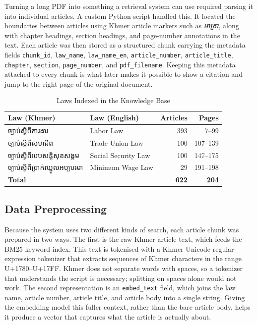 \hs Turning a long PDF into something a retrieval system can use required parsing it
into individual articles. A custom Python script handled this. It located the boundaries
between articles using Khmer article markers such as \textit{មាត្រា}, along with chapter
headings, section headings, and page-number annotations in the text. Each article was
then stored as a structured chunk carrying the metadata fields \texttt{chunk\_id},
\texttt{law\_name}, \texttt{law\_name\_en}, \texttt{article\_number},
\texttt{article\_title}, \texttt{chapter}, \texttt{section}, \texttt{page\_number}, and
\texttt{pdf\_filename}. Keeping this metadata attached to every chunk is what later makes
it possible to show a citation and jump to the right page of the original document.

\begin{table}[H]
\centering
\caption{Laws Indexed in the Knowledge Base}
\label{tab:laws_indexed}
\begin{tabular}{p{5cm} p{4cm} r r}
\toprule
\textbf{Law (Khmer)} & \textbf{Law (English)} & \textbf{Articles} & \textbf{Pages} \\
\midrule
{\khmerfont ច្បាប់ស្តីពីការងារ} & Labor Law & 393 & 7--99 \\
{\khmerfont ច្បាប់ស្តីពីសហជីព} & Trade Union Law & 100 & 107--139 \\
{\khmerfont ច្បាប់ស្តីពីរបបសន្តិសុខសង្គម} & Social Security Law & 100 & 147--175 \\
{\khmerfont ច្បាប់ស្តីពីប្រាក់ឈ្នួលអប្បបរមា} & Minimum Wage Law & 29 & 191--198 \\
\midrule
\textbf{Total} & & \textbf{622} & \textbf{204} \\
\bottomrule
\end{tabular}
\end{table}

\subsection{Data Preprocessing}

\hs Because the system uses two different kinds of search, each article chunk was
prepared in two ways. The first is the raw Khmer article text, which feeds the BM25
keyword index. This text is tokenised with a Khmer Unicode regular-expression tokenizer
that extracts sequences of Khmer characters in the range U+1780--U+17FF. Khmer does not
separate words with spaces, so a tokenizer that understands the script is necessary;
splitting on spaces alone would not work. The second representation is an
\texttt{embed\_text} field, which joins the law name, article number, article title,
and article body into a single string. Giving the embedding model this fuller context,
rather than the bare article body, helps it produce a vector that captures what the
article is actually about.


